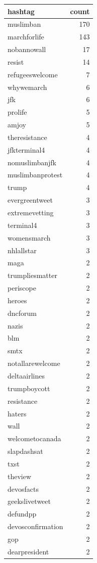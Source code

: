 \begin{tabular}{lr}
\toprule
hashtag & count \\
\midrule
muslimban & 170 \\
marchforlife & 143 \\
nobannowall & 17 \\
resist & 14 \\
refugeeswelcome & 7 \\
whywemarch & 6 \\
jfk & 6 \\
prolife & 5 \\
amjoy & 5 \\
theresistance & 4 \\
jfkterminal4 & 4 \\
nomuslimbanjfk & 4 \\
muslimbanprotest & 4 \\
trump & 4 \\
evergreentweet & 3 \\
extremevetting & 3 \\
terminal4 & 3 \\
womensmarch & 3 \\
nhlallstar & 3 \\
maga & 2 \\
trumpliesmatter & 2 \\
periscope & 2 \\
heroes & 2 \\
dncforum & 2 \\
nazis & 2 \\
blm & 2 \\
smtx & 2 \\
notallarewelcome & 2 \\
deltaairlines & 2 \\
trumpboycott & 2 \\
resistance & 2 \\
haters & 2 \\
wall & 2 \\
welcometocanada & 2 \\
slapdashsat & 2 \\
txst & 2 \\
theview & 2 \\
devosfacts & 2 \\
geekslivetweet & 2 \\
defundpp & 2 \\
devosconfirmation & 2 \\
gop & 2 \\
dearpresident & 2 \\

\end{tabular}
